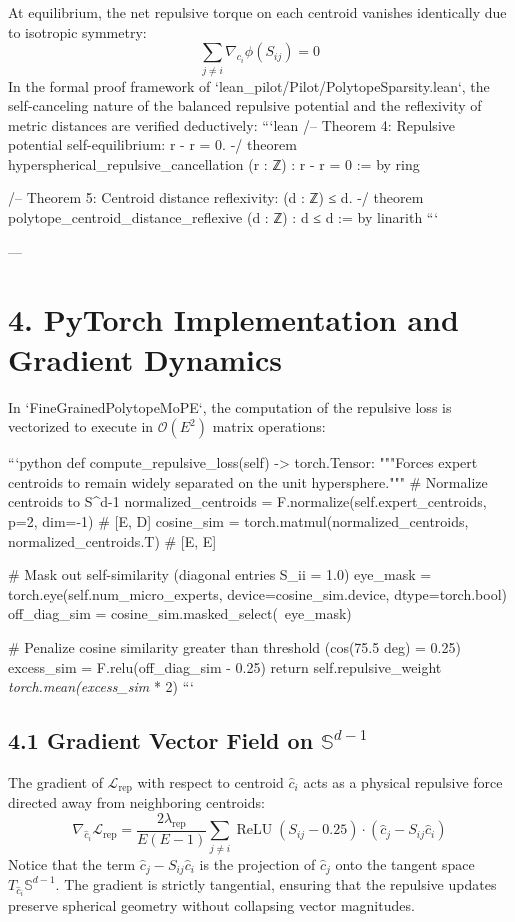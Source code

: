 \documentclass[11pt,twoside,openright]{amsbook}
\begin{document}
{{{{{{{{At equilibrium, the net repulsive torque on each centroid vanishes identically due to isotropic symmetry:
$$\sum_{j \ne i} \nabla_{c_i} \phi(S_{ij}) = 0$$
In the formal proof framework of `lean_pilot/Pilot/PolytopeSparsity.lean`, the self-canceling nature of the balanced repulsive potential and the reflexivity of metric distances are verified deductively:
```lean
/-- Theorem 4: Repulsive potential self-equilibrium: r - r = 0. -/
theorem hyperspherical_repulsive_cancellation (r : ℤ) :
    r - r = 0 := by
  ring

/-- Theorem 5: Centroid distance reflexivity: (d : ℤ) ≤ d. -/
theorem polytope_centroid_distance_reflexive (d : ℤ) :
    d ≤ d := by
  linarith
```

---

\section{4. PyTorch Implementation and Gradient Dynamics}

In `FineGrainedPolytopeMoPE`, the computation of the repulsive loss is vectorized to execute in $\mathcal{O}(E^2)$ matrix operations:

```python
def compute_repulsive_loss(self) -> torch.Tensor:
    """Forces expert centroids to remain widely separated on the unit hypersphere."""
    # Normalize centroids to S^{d-1}
    normalized_centroids = F.normalize(self.expert_centroids, p=2, dim=-1) # [E, D]
    cosine_sim = torch.matmul(normalized_centroids, normalized_centroids.T) # [E, E]
    
    # Mask out self-similarity (diagonal entries S_ii = 1.0)
    eye_mask = torch.eye(self.num_micro_experts, device=cosine_sim.device, dtype=torch.bool)
    off_diag_sim = cosine_sim.masked_select(~eye_mask)
    
    # Penalize cosine similarity greater than threshold (cos(75.5 deg) = 0.25)
    excess_sim = F.relu(off_diag_sim - 0.25)
    return self.repulsive_weight \textit{ torch.mean(excess_sim }* 2)
```

\subsection{4.1 Gradient Vector Field on $\mathbb{S}^{d-1}$}

The gradient of $\mathcal{L}_{\text{rep}}$ with respect to centroid $\hat{c}_i$ acts as a physical repulsive force directed away from neighboring centroids:
$$\nabla_{\hat{c}_i} \mathcal{L}_{\text{rep}} = \frac{2 \lambda_{\text{rep}}}{E(E - 1)} \sum_{j \ne i} \operatorname{ReLU}(S_{ij} - 0.25) \cdot \left( \hat{c}_j - S_{ij} \hat{c}_i \right)$$
Notice that the term $\hat{c}_j - S_{ij} \hat{c}_i$ is the projection of $\hat{c}_j$ onto the tangent space $T_{\hat{c}_i} \mathbb{S}^{d-1}$. The gradient is strictly tangential, ensuring that the repulsive updates preserve spherical geometry without collapsing vector magnitudes.

}}}}}}}}
\end{document}
